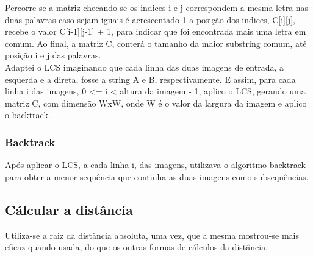 \documentclass[a4paper, 12pt]{article}
\begin{document}
	Percorre-se a matriz checando se os indices i e j correspondem a mesma letra nas duas palavras caso sejam iguais é acrescentado 1 a posição dos indices, C[i][j], recebe o valor C[i-1][j-1] + 1, para indicar que foi encontrada mais uma letra em comum. Ao final, a matriz C, conterá o tamanho da maior substring comum, até posição i e j das palavras.\\

	Adaptei o LCS imaginando que cada linha das duas imagens de entrada, a esquerda e a direta, fosse a string A e B, respectivamente. E assim, para cada linha i das imagens, 0 <= i < altura da imagem - 1, aplico o LCS, gerando uma matriz C, com dimensão WxW, onde W é o valor da largura da imagem e aplico o backtrack.

	\subsubsection{Backtrack}

	Após aplicar o LCS, a cada linha i, das imagens, utilizava o algoritmo backtrack para obter a menor sequência que continha as duas imagens como subsequências.

	\subsection{Cálcular a distância}

	Utiliza-se a raiz da distância absoluta, uma vez, que a mesma mostrou-se mais eficaz quando usada, do que os outras formas de cálculos da distância.
\end{document}
